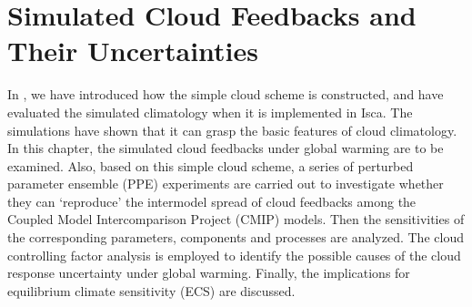 \chapter{Simulated Cloud Feedbacks and Their Uncertainties}
\label{ch:cld_fbk}

In , we have introduced how the simple cloud scheme is constructed, and have evaluated the simulated climatology when it is implemented in Isca. The simulations have shown that it can grasp the basic features of cloud climatology. In this chapter, the simulated cloud feedbacks under global warming are to be examined. Also, based on this simple cloud scheme, a series of perturbed parameter ensemble (PPE) experiments are carried out to investigate whether they can `reproduce' the intermodel spread of cloud feedbacks among the Coupled Model Intercomparison Project (CMIP) models. Then the sensitivities of the corresponding parameters, components and processes are analyzed. The cloud controlling factor analysis is employed to identify the possible causes of the cloud response uncertainty under global warming. Finally, the implications for equilibrium climate sensitivity (ECS) are discussed.

